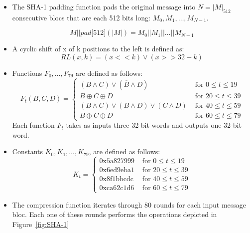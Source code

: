 \begin{itemize}
\item The \textsc{SHA-1} padding function pads the original message into $N=\vert M\vert_{512}$ consecutive blocs that are each 512 bits long: $M_0, M_1,{\ldots}, M_{N−1}$.

$$ M\vert \vert pad\lbrack 512\rbrack (\vert M\vert ) = M_0 \vert \vert M_1 \vert \vert \ldots \vert \vert M_{N-1}$$
\item A cyclic shift of x of k positions to the left is defined as:
$$RL(x,k)=(x<<k)\lor (x>>32-k)$$

\item Functions $F_0, {\ldots}, F_{79}$ are defined as follows:
\begin{equation}
F_t(B,C,D) =
\begin{cases}
(B \wedge C)  \vee (\overline{B} \wedge D) & \mbox{ for }0 \le t \le 19 \\
B \oplus C \oplus D & \mbox{ for } 20 \le t \le 39 \\
(B \wedge C)  \vee (B \wedge D)  \vee (C \wedge D) & \mbox{ for }40\le t\le 59 \\ 
B \oplus C \oplus D & \mbox{ for }60\le t\le 79 
\end{cases}
\end{equation}
Each function $F_t$ takes as inputs three 32-bit words and outputs one 32-bit word.

\item Constants $K_0, K_1, {\ldots}, K_{79}$, are defined as follows:
\begin{equation}
K_t =
\begin{cases}
\mbox{0x5a827999} & \mbox{ for }0 \le t \le 19 \\
\mbox{0x6ed9eba1} & \mbox{ for }20 \le t\le 39 \\ 
\mbox{0x8f1bbcdc} & \mbox{ for }40\le t\le 59 \\ 
\mbox{0xca62c1d6} & \mbox{ for }60\le t\le 79 
\end{cases}
\end{equation}
 \item The compression function iterates through 80 rounds for each input message bloc. Each one of these rounds performs the operations depicted in Figure~\ref{fig:SHA-1}
\end{itemize}

